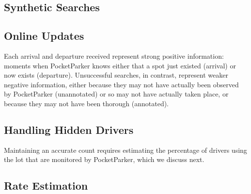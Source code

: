 \subsection{Synthetic Searches}

\subsection{Online Updates}

Each arrival and departure received represent strong positive information:
moments when PocketParker knows either that a spot just existed (arrival) or
now exists (departure). Unsuccessful searches, in contrast, represent weaker
negative information, either because they may not have actually been observed
by PocketParker (unannotated) or so may not have actually taken place, or
because they may not have been thorough (annotated).

\subsection{Handling Hidden Drivers}

Maintaining an accurate count requires estimating the
percentage of drivers using the lot that are monitored by PocketParker, which
we discuss next.

\subsection{Rate Estimation}
